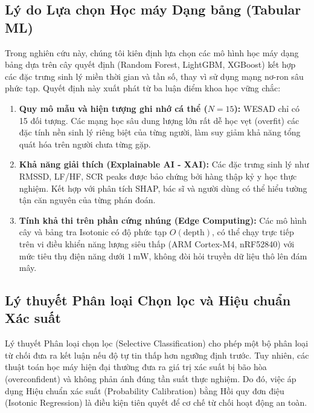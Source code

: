 \documentclass[conference]{IEEEtran}
\begin{document}
\subsection{Lý do Lựa chọn Học máy Dạng bảng (Tabular ML)}
Trong nghiên cứu này, chúng tôi kiên định lựa chọn các mô hình học máy dạng bảng dựa trên cây quyết định (Random Forest, LightGBM, XGBoost) kết hợp các đặc trưng sinh lý miền thời gian và tần số, thay vì sử dụng mạng nơ-ron sâu phức tạp. Quyết định này xuất phát từ ba luận điểm khoa học vững chắc:
\begin{enumerate}
    \item \textbf{Quy mô mẫu và hiện tượng ghi nhớ cá thể ($N=15$):} WESAD chỉ có 15 đối tượng. Các mạng học sâu dung lượng lớn rất dễ học vẹt (overfit) các đặc tính nền sinh lý riêng biệt của từng người, làm suy giảm khả năng tổng quát hóa trên người chưa từng gặp.
    \item \textbf{Khả năng giải thích (Explainable AI - XAI):} Các đặc trưng sinh lý như RMSSD, LF/HF, SCR peaks được bảo chứng bởi hàng thập kỷ y học thực nghiệm. Kết hợp với phân tích SHAP, bác sĩ và người dùng có thể hiểu tường tận căn nguyên của từng phán đoán.
    \item \textbf{Tính khả thi trên phần cứng nhúng (Edge Computing):} Các mô hình cây và bảng tra Isotonic có độ phức tạp $O(\text{depth})$, có thể chạy trực tiếp trên vi điều khiển năng lượng siêu thấp (ARM Cortex-M4, nRF52840) với mức tiêu thụ điện năng dưới $1\,\text{mW}$, không đòi hỏi truyền dữ liệu thô lên đám mây.
\end{enumerate}

\subsection{Lý thuyết Phân loại Chọn lọc và Hiệu chuẩn Xác suất}
Lý thuyết Phân loại chọn lọc (Selective Classification) \cite{geifman2017selective} cho phép một bộ phân loại từ chối đưa ra kết luận nếu độ tự tin thấp hơn ngưỡng định trước. Tuy nhiên, các thuật toán học máy hiện đại thường đưa ra giá trị xác suất bị bão hòa (overconfident) và không phản ánh đúng tần suất thực nghiệm. Do đó, việc áp dụng Hiệu chuẩn xác suất (Probability Calibration) bằng Hồi quy đơn điệu (Isotonic Regression) \cite{niculescu2005predicting} là điều kiện tiên quyết để cơ chế từ chối hoạt động an toàn.

\end{document}
